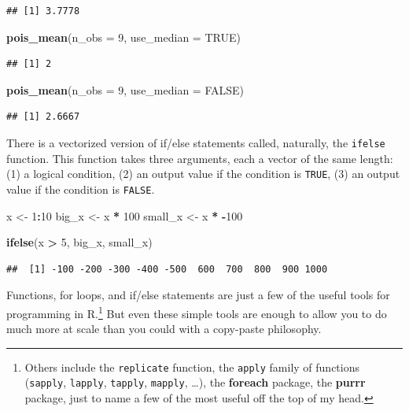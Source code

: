 \documentclass[12pt,oneside,openany]{book}
\newenvironment{Shaded}{\begin{snugshade}}{\end{snugshade}}
\newcommand{\KeywordTok}[1]{\textcolor[rgb]{0.13,0.29,0.53}{\textbf{#1}}}
\newcommand{\DataTypeTok}[1]{\textcolor[rgb]{0.13,0.29,0.53}{#1}}
\newcommand{\DecValTok}[1]{\textcolor[rgb]{0.00,0.00,0.81}{#1}}
\newcommand{\StringTok}[1]{\textcolor[rgb]{0.31,0.60,0.02}{#1}}
\newcommand{\OtherTok}[1]{\textcolor[rgb]{0.56,0.35,0.01}{#1}}
\newcommand{\OperatorTok}[1]{\textcolor[rgb]{0.81,0.36,0.00}{\textbf{#1}}}
\newcommand{\NormalTok}[1]{#1}
\let\rmarkdownfootnote\footnote%
\def\footnote{\protect\rmarkdownfootnote}
\begin{document}
\begin{verbatim}
## [1] 3.7778
\end{verbatim}

\begin{Shaded}
\begin{Highlighting}[]
\KeywordTok{pois_mean}\NormalTok{(}\DataTypeTok{n_obs =} \DecValTok{9}\NormalTok{, }\DataTypeTok{use_median =} \OtherTok{TRUE}\NormalTok{)}
\end{Highlighting}
\end{Shaded}

\begin{verbatim}
## [1] 2
\end{verbatim}

\begin{Shaded}
\begin{Highlighting}[]
\KeywordTok{pois_mean}\NormalTok{(}\DataTypeTok{n_obs =} \DecValTok{9}\NormalTok{, }\DataTypeTok{use_median =} \OtherTok{FALSE}\NormalTok{)}
\end{Highlighting}
\end{Shaded}

\begin{verbatim}
## [1] 2.6667
\end{verbatim}

There is a vectorized version of if/else statements called, naturally,
the \texttt{ifelse} function. This function takes three arguments, each
a vector of the same length: (1) a logical condition, (2) an output
value if the condition is \texttt{TRUE}, (3) an output value if the
condition is \texttt{FALSE}.

\begin{Shaded}
\begin{Highlighting}[]
\NormalTok{x <-}\StringTok{ }\DecValTok{1}\OperatorTok{:}\DecValTok{10}
\NormalTok{big_x <-}\StringTok{ }\NormalTok{x }\OperatorTok{*}\StringTok{ }\DecValTok{100}
\NormalTok{small_x <-}\StringTok{ }\NormalTok{x }\OperatorTok{*}\StringTok{ }\OperatorTok{-}\DecValTok{100}

\KeywordTok{ifelse}\NormalTok{(x }\OperatorTok{>}\StringTok{ }\DecValTok{5}\NormalTok{, big_x, small_x)}
\end{Highlighting}
\end{Shaded}

\begin{verbatim}
##  [1] -100 -200 -300 -400 -500  600  700  800  900 1000
\end{verbatim}

Functions, for loops, and if/else statements are just a few of the
useful tools for programming in R.\footnote{Others include the
  \texttt{replicate} function, the \texttt{apply} family of functions
  (\texttt{sapply}, \texttt{lapply}, \texttt{tapply}, \texttt{mapply},
  \ldots{}), the \textbf{foreach} package, the \textbf{purrr} package,
  just to name a few of the most useful off the top of my head.} But
even these simple tools are enough to allow you to do much more at scale
than you could with a copy-paste philosophy.
\end{document}
